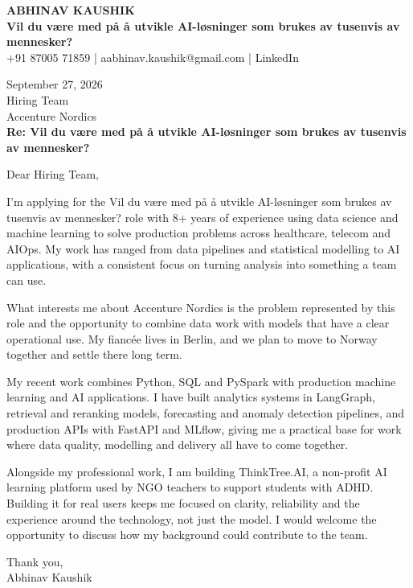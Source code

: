 \documentclass[10pt,a4paper]{article}
\begin{document}
\begin{center}
{\Large\bfseries ABHINAV KAUSHIK}\\[2pt]
{\bfseries Vil du være med på å utvikle AI-løsninger som brukes av tusenvis av mennesker?}\\[2pt]
+91 87005 71859 \quad | \quad aabhinav.kaushik@gmail.com \quad | \quad LinkedIn
\end{center}
\vspace{8pt}
September 27, 2026\\[6pt]
Hiring Team\\
Accenture Nordics\\[4pt]
\textbf{Re: Vil du være med på å utvikle AI-løsninger som brukes av tusenvis av mennesker?}

Dear Hiring Team,

I’m applying for the Vil du være med på å utvikle AI-løsninger som brukes av tusenvis av mennesker? role with 8+ years of experience using data science and machine learning to solve production problems across healthcare, telecom and AIOps. My work has ranged from data pipelines and statistical modelling to AI applications, with a consistent focus on turning analysis into something a team can use.

What interests me about Accenture Nordics is the problem represented by this role and the opportunity to combine data work with models that have a clear operational use. My fiancée lives in Berlin, and we plan to move to Norway together and settle there long term.

My recent work combines Python, SQL and PySpark with production machine learning and AI applications. I have built analytics systems in LangGraph, retrieval and reranking models, forecasting and anomaly detection pipelines, and production APIs with FastAPI and MLflow, giving me a practical base for work where data quality, modelling and delivery all have to come together.

Alongside my professional work, I am building ThinkTree.AI, a non-profit AI learning platform used by NGO teachers to support students with ADHD. Building it for real users keeps me focused on clarity, reliability and the experience around the technology, not just the model. I would welcome the opportunity to discuss how my background could contribute to the team.

Thank you,\\
Abhinav Kaushik
\end{document}
